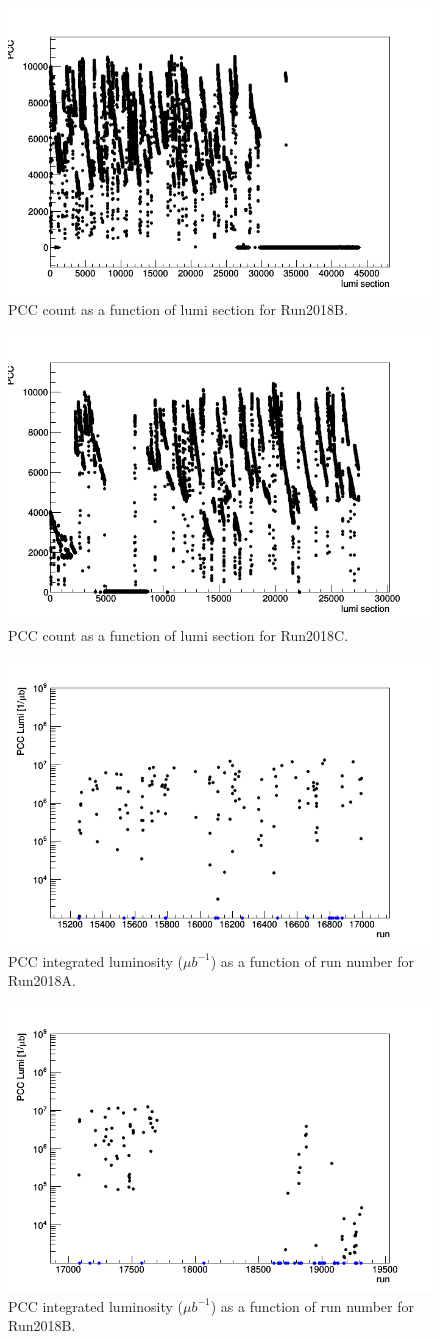\begin{figure}[H]
  \centering
  \includegraphics[width=0.5\columnwidth]{./ls_lumi_2018B.png}
  \caption{PCC count as a function of lumi section for Run2018B.}
  \label{fig:CMS}
\end{figure}

\begin{figure}[H]
  \centering
  \includegraphics[width=0.5\columnwidth]{./ls_lumi_2018C.png}
  \caption{PCC count as a function of lumi section for Run2018C.}
  \label{fig:CMS}
\end{figure}


\begin{figure}[H]
  \centering
  \includegraphics[width=0.52\columnwidth]{./runs.png}
  \caption{PCC integrated luminosity ($\mu b^{-1}$) as a function of run number for Run2018A.}
  \label{fig:CMS}
\end{figure}


\begin{figure}[H]
  \centering
  \includegraphics[width=0.52\columnwidth]{./runs_2018B.png}
  \caption{PCC integrated luminosity ($\mu b^{-1}$) as a function of run number for Run2018B.}
  \label{fig:CMS}
\end{figure}


